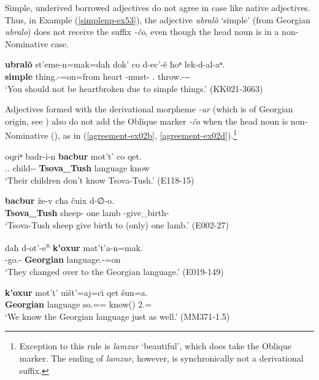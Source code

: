 Simple, underived borrowed adjectives do not agree in case like native adjectives. Thus, in Example (\ref{simplenp-ex53}), the adjective \textit{ubral\u{o}} `simple' (from Georgian \textit{ubralo}) does not receive the suffix \textit{-čo}, even though the head noun is in a non-Nominative case.

\begin{exe}
	\ex\label{simplenp-ex53}
	\gll \textbf{ubral\u{o}} st'eme-n=mak=daħ dok' co d-ec'-\u{e} ħoⁿ lek-d-al-aⁿ. \\
	\textbf{simple} thing.{\Obl}-{\Dat}=on=from heart {\Neg} {\D}-must-{\Npst} {\Ssg}.{\Dat} throw.{\Ipfv}-{\D}-{\Intr}-{\Inf} \\
	\trans `You should not be heartbroken due to simple things.'
	\hfill (KK021-3663)
\end{exe}

Adjectives formed with the derivational morpheme \textit{-ur} (which is of Georgian origin, see ) also do not add the Oblique marker \textit{-čo} when the head noun is non-Nominative (\cite[13]{desheriev53}), as in (\ref{agreement-ex02b}, \ref{agreement-ex02d}).\footnote{Exception to this rule is \textit{lamzur} `beautiful', which does take the Oblique marker. The ending of \textit{lamzur}, however, is synchronically not a derivational suffix.}

\begin{exe}
	\ex\label{agreement-ex02}
	\begin{xlist}
		
		\ex\label{agreement-ex02a}
		\gll oqriⁿ badr-i-n \textbf{bacbur} mot't' co qet. \\
		{\Dist}.{\Pl}.{\Gen} child-{\Pl}-{\Dat} \textbf{Tsova\_Tush} language {\Neg} know \\
		\trans `Their children don't know Tsova-Tush.'
		\hfill (E118-15)
		
		\ex\label{agreement-ex02b}
		\gll \textbf{bacbur} že-v cħa čuix d-∅-o. \\
		\textbf{Tsova\_Tush} sheep-{\Erg} one lamb {\D}-give\_birth-{\Npst} \\
		\trans `Tsova-Tush sheep give birth to (only) one lamb.'
		\hfill (E002-27)
		
		\ex\label{agreement-ex02c}
		\gll daħ d-ot'-e\textsuperscript{n} \textbf{k'oxur} mat't'a-n=mak.  \\
		{\Pv} {\D}-go.{\Ipfv}-{\Aor} \textbf{Georgian} language.{\Obl}-{\Dat}=on \\
		\trans `They changed over to the Georgian language.'
		\hfill (E019-149)
		
		\ex\label{agreement-ex02d}
		\gll \textbf{k'oxur} mot't' uišt'=aj=c\u{\i} qet šun=a. \\
		\textbf{Georgian} language so.{\Dist}={\Add}={\Aff} know({\Npst}) 2{\Pl}.{\Dat}={\Emph} \\
		\trans `We know the Georgian language just as well.'
		\hfill (MM371-1.5)
		
	\end{xlist}
\end{exe}

